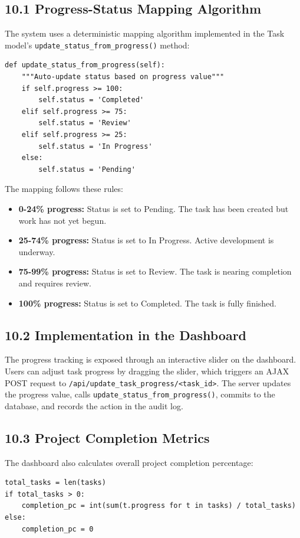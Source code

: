 ﻿\documentclass[12pt]{article}
\begin{document}
\subsection*{10.1 Progress-Status Mapping Algorithm}
The system uses a deterministic mapping algorithm implemented in the Task model's \texttt{update\_status\_from\_progress()} method:

\begin{lstlisting}[style=pycode]
def update_status_from_progress(self):
    """Auto-update status based on progress value"""
    if self.progress >= 100:
        self.status = 'Completed'
    elif self.progress >= 75:
        self.status = 'Review'
    elif self.progress >= 25:
        self.status = 'In Progress'
    else:
        self.status = 'Pending'
\end{lstlisting}

The mapping follows these rules:
\begin{itemize}
\item \textbf{0-24\% progress:} Status is set to Pending. The task has been created but work has not yet begun.
\item \textbf{25-74\% progress:} Status is set to In Progress. Active development is underway.
\item \textbf{75-99\% progress:} Status is set to Review. The task is nearing completion and requires review.
\item \textbf{100\% progress:} Status is set to Completed. The task is fully finished.
\end{itemize}

\subsection*{10.2 Implementation in the Dashboard}
The progress tracking is exposed through an interactive slider on the dashboard. Users can adjust task progress by dragging the slider, which triggers an AJAX POST request to \texttt{/api/update\_task\_progress/<task\_id>}. The server updates the progress value, calls \texttt{update\_status\_from\_progress()}, commits to the database, and records the action in the audit log.

\subsection*{10.3 Project Completion Metrics}
The dashboard also calculates overall project completion percentage:

\begin{lstlisting}[style=pycode]
total_tasks = len(tasks)
if total_tasks > 0:
    completion_pc = int(sum(t.progress for t in tasks) / total_tasks)
else:
    completion_pc = 0
\end{lstlisting}
\end{document}
